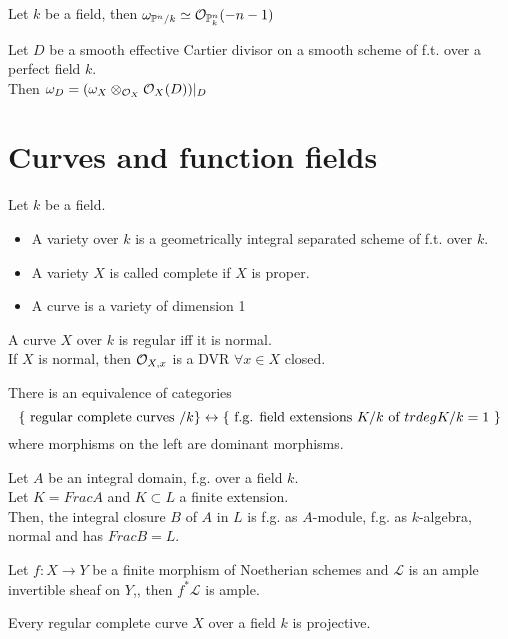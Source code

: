 \documentclass[../main.tex]{subfiles}
\begin{document}
\begin{crly}
Let $k$ be a field, then $\omega_{ \mathbb{P}^{n}/k} \simeq \mathcal{O}_{\mathbb{P}^{n}_k} ( -n-1) $ 
\end{crly}
\begin{propo}
Let $D$ be a smooth effective Cartier divisor on a smooth scheme of f.t. over a perfect field $k$.\\
Then $\omega_D = ( \omega_X \otimes_{\mathcal{O}_X} \mathcal{O}_X( D)  )|_D$ 
\end{propo}

\section{Curves and function fields}
\begin{defn}[Varieties]
	Let $k$ be a field.
	\begin{itemize}
	\item A variety over $k$ is a geometrically integral separated scheme of f.t. over $k$.
	\item A variety $X$ is called complete if $X$ is proper.
	\item A curve is a variety of dimension 1
	\end{itemize}
\end{defn}
\begin{lemma}
A curve $X$ over $k$  is regular iff it is normal.\\
If $X$ is normal, then $\mathcal{O}_{X,x} $ is a DVR $\forall x \in X$ closed.
\end{lemma}
\begin{thm}
	There is an equivalence of categories
	\[ 
	\left\{ \text{ regular complete curves } /k \right\} \leftrightarrow \left\{ \text{ f.g. field extensions $K /k$ of $ trdeg K /k =1$  }  \right\} 
	\]
	where morphisms on the left are dominant morphisms.
\end{thm}
\begin{lemma}
Let $A$ be an integral domain, f.g. over a field $k$.\\
Let $K = Frac A$ and $K \subset L$ a finite extension.\\
Then, the integral closure $B$ of $A$ in $L$ is f.g. as $A$-module, f.g. as $k$-algebra, normal and has $Frac B = L$.
\end{lemma}
\begin{lemma}
Let $f:X\to Y$ be a finite morphism of Noetherian schemes and $\mathcal{L}$ is an ample invertible sheaf on $Y$,, then $f^{\ast} \mathcal{L}$ is ample.
\end{lemma}
\begin{crly}
Every regular complete curve $X$ over a field $k$ is projective.
\end{crly}
\end{document}
